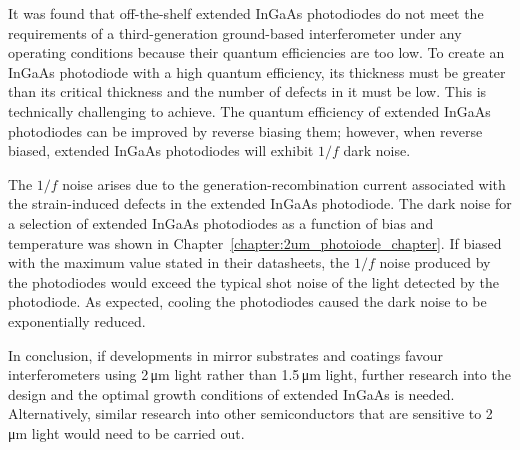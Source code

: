 \par
It was found that off-the-shelf extended InGaAs photodiodes do not meet the requirements of a third-generation ground-based interferometer under any operating conditions because their quantum efficiencies are too low. To create an InGaAs photodiode with a high quantum efficiency, its thickness must be greater than its critical thickness and the number of defects in it must be low. This is technically challenging to achieve. The quantum efficiency of extended InGaAs photodiodes can be improved by reverse biasing them; however, when reverse biased, extended InGaAs photodiodes will exhibit $1/f$ dark noise.
\par
The $1/f$ noise arises due to the generation-recombination current associated with the strain-induced defects in the extended InGaAs photodiode. The dark noise for a selection of extended InGaAs photodiodes as a function of bias and temperature was shown in Chapter~\ref{chapter:2um_photoiode_chapter}. If biased with the maximum value stated in their datasheets, the $1/f$ noise produced by the photodiodes would exceed the typical shot noise of the light detected by the photodiode. As expected, cooling the photodiodes caused the dark noise to be exponentially reduced.
\par
In conclusion, if developments in mirror substrates and coatings favour interferometers using 2\,\si{\micro\metre} light rather than 1.5\,\si{\micro\metre} light, further research into the design and the optimal growth conditions of extended InGaAs is needed. Alternatively, similar research into other semiconductors that are sensitive to 2\,\si{\micro\metre} light would need to be carried out.

